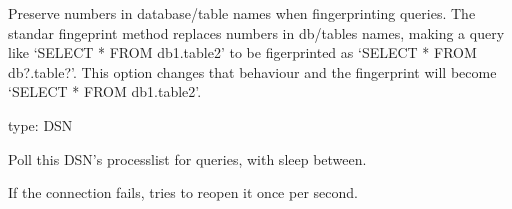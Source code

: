 \documentclass[letterpaper,10pt,english]{sphinxmanual}
\begin{document}

\begin{fulllineitems}
\label{\detokenize{mariadb-query-digest:cmdoption-mariadb-query-digest-preserve-embedded-numbers}}
\sphinxAtStartPar
Preserve numbers in database/table names when fingerprinting queries.
The standar fingeprint method replaces numbers in db/tables names, making
a query like ‘SELECT * FROM db1.table2’ to be figerprinted as ‘SELECT * FROM db?.table?’.
This option changes that behaviour and the fingerprint will become
‘SELECT * FROM db1.table2’.

\end{fulllineitems}


\begin{fulllineitems}
\label{\detokenize{mariadb-query-digest:cmdoption-mariadb-query-digest-processlist}}
\sphinxAtStartPar
type: DSN

\sphinxAtStartPar
Poll this DSN’s processlist for queries, with {\hyperref[\detokenize{mariadb-query-digest:cmdoption-mariadb-query-digest-interval}]{}} sleep between.

\sphinxAtStartPar
If the connection fails,  tries to reopen it once per second.

\end{fulllineitems}
\end{document}
